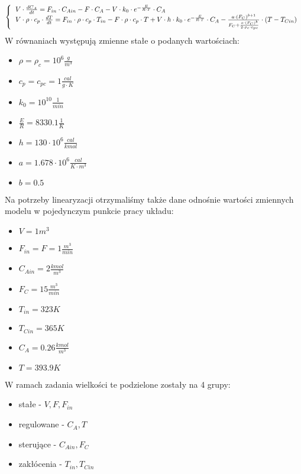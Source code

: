 \begin{equation}
	\left\{
	\begin{tabular}{l}
	$V \cdot \frac{dC_A}{dt}=F_{in} \cdot C_{Ain}-F \cdot C_A-V \cdot k_0 \cdot e^{-\frac{E}{R \cdot T}} \cdot C_A$\\
	$V \cdot \rho \cdot c_p \cdot \frac{dT}{dt}=F_{in} \cdot \rho \cdot c_p \cdot T_{in}-F \cdot \rho \cdot c_p \cdot T+V \cdot h \cdot k_0 \cdot e^{-\frac{E}{R \cdot T}} \cdot C_A - \frac{a \cdot (F_C)^{b+1}}{F_C+\frac{a \cdot (F_C)^b}{2 \cdot \rho_c \cdot c_{pc}}} \cdot (T-T_{Cin})$
	\end{tabular}
	\right.
\end{equation}
W równaniach występują zmienne stałe o podanych wartościach:\\
\begin{itemize}
	\item $\rho=\rho_c=10^6\frac{g}{m^3}$
	\item $c_p=c_{pc} = 1 \frac{cal}{g\cdot K}$
	\item $k_0 = 10^{10} \frac{1}{min}$
	\item $\frac{E}{R} = 8330.1 \frac{1}{K}$
	\item $h = 130\cdot 10^6 \frac{cal}{kmol}$
	\item $a = 1.678\cdot 10^6\frac{cal}{K\cdot m^3}$
	\item $b = 0.5$
\end{itemize}
Na potrzeby linearyzacji otrzymaliśmy także dane odnośnie wartości zmiennych modelu w pojedynczym punkcie pracy układu:\\
\begin{itemize}
	\item $V=1m^3$
	\item $F_{in} = F = 1 \frac{m^3}{min}$
	\item $C_{Ain} = 2 \frac{kmol}{m^3}$
	\item $F_C = 15 \frac{m^3}{min}$
	\item $T_{in} = 323K$
	\item $T_{Cin} = 365K$
	\item $C_A = 0.26\frac{kmol}{m^3}$
	\item $T = 393.9K$
\end{itemize}
W ramach zadania wielkości te podzielone zostały na 4 grupy:\\
\begin{itemize}
	\item stałe - $V,F,F_{in}$
	\item regulowane - $C_A,T$
	\item sterujące - $C_{Ain},F_C$
	\item zakłócenia - $T_{in},T_{Cin}$
\end{itemize}
